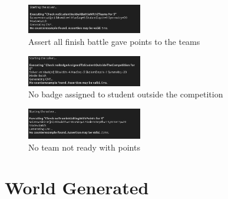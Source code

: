 \begin{figure}[H]
    \centering
    \includegraphics[width=190px]{Images/alloy/assert_4.png}
    \caption{Assert all finish battle gave points to the teams}
\end{figure}

\begin{figure}[H]
    \centering
    \includegraphics[width=190px]{Images/alloy/assert_5.png}
    \caption{No badge assigned to student outside the competition}
\end{figure}

\begin{figure}[H]
    \centering
    \includegraphics[width=190px]{Images/alloy/assert_6.png}
    \caption{No team not ready with points}
\end{figure}

\section{World Generated}

